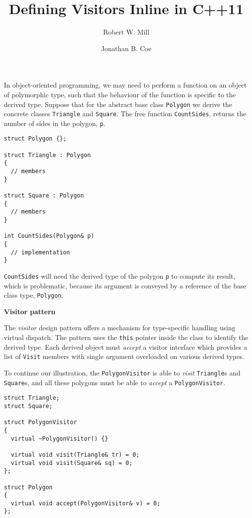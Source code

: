 \documentclass[10pt,a4paper,twocolumn]{article}
\title{Defining Visitors Inline in C++11}
\author{Robert W. Mill \and Jonathan B. Coe}
\renewcommand\section[1]{
    \begin{minipage}[c]{0.94\linewidth}
    \large \raggedright \sffamily \textbf{#1}
    \end{minipage}
}
\newcommand\mycode[1]{{\small\texttt{#1}}}
\begin{document}
 
\maketitle

In object-oriented programming, we may need to perform a function on an object
of polymorphic type, such that the behaviour of the function is specific to the
derived type. Suppose that for the abstract base class \mycode{Polygon} we
derive the concrete classes \mycode{Triangle} and \mycode{Square}. The free
function \mycode{CountSides}, returns the number of sides in the polygon,
\mycode{p}.

{\small\begin{verbatim}struct Polygon {};

struct Triangle : Polygon 
{ 
  // members 
}

struct Square : Polygon 
{ 
  // members 
}

int CountSides(Polygon& p)
{ 
  // implementation 
}\end{verbatim}}

\mycode{CountSides} will need the derived type of the polygon \mycode{p} to
compute its result, which is problematic, because its argument is conveyed by a
reference of the base class type, \mycode{Polygon}.

\section{Visitor pattern}

The \emph{visitor} design pattern offers a mechanism for type-specific handling
using virtual dispatch. The pattern uses the \mycode{this} pointer inside the
class to identify the derived type. Each derived object must \emph{accept} a
visitor interface which provides a list of \mycode{Visit} members with single
argument overloaded on various derived types.

To continue our illustration, the \mycode{PolygonVisitor} is able to
\emph{visit} \mycode{Triangle}s and \mycode{Square}s, and all these polygons
must be able to \emph{accept} a \mycode{PolygonVisitor}.

{\small\begin{verbatim} 
struct Triangle; 
struct Square;

struct PolygonVisitor 
{ 
  virtual ~PolygonVisitor() {}

  virtual void visit(Triangle& tr) = 0; 
  virtual void visit(Square& sq) = 0;
};

struct Polygon 
{ 
  virtual void accept(PolygonVisitor& v) = 0; 
};\end{verbatim}}
\end{document}

